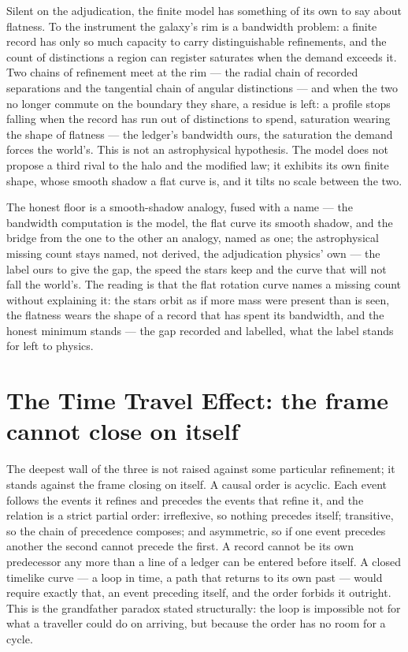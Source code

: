 Silent on the adjudication, the finite model has something of its own to say about flatness. To the instrument
the galaxy's rim is a bandwidth problem: a finite record has only so much capacity to carry distinguishable
refinements, and the count of distinctions a region can register saturates when the demand exceeds it. Two
chains of refinement meet at the rim --- the radial chain of recorded separations and the tangential chain of
angular distinctions --- and when the two no longer commute on the boundary they share, a residue is left: a
profile stops falling when the record has run out of distinctions to spend, saturation wearing the
shape of flatness --- the ledger's bandwidth ours, the saturation the demand forces the world's. This is not an
astrophysical hypothesis. The model does not propose a third rival to the halo and the modified law; it
exhibits its own finite shape, whose smooth shadow a flat curve is, and it tilts no scale between the two.

The honest floor is a smooth-shadow analogy, fused with a name --- the bandwidth computation is the model, the
flat curve its smooth shadow, and the bridge from the one to the other an analogy, named as one; the
astrophysical missing count stays named, not derived, the adjudication physics' own --- the label ours to give
the gap, the speed the stars keep and the curve that will not fall the world's. The reading is that the flat
rotation curve names a missing count without explaining it: the stars orbit as if more mass were present than
is seen, the flatness wears the shape of a record that has spent its bandwidth, and the honest minimum
stands --- the gap recorded and labelled, what the label stands for left to physics.

\section{The Time Travel Effect: the frame cannot close on itself}
\label{se:time-travel}

The deepest wall of the three is not raised against some particular refinement; it stands against the frame
closing on itself. A causal order is acyclic. Each
event follows the events it refines and precedes the events that refine it, and the relation is a strict
partial order: irreflexive, so nothing precedes itself; transitive, so the chain of precedence composes; and
asymmetric, so if one event precedes another the second cannot precede the first. A record cannot be its own
predecessor any more than a line of a ledger can be entered before itself. A closed timelike curve --- a loop
in time, a path that returns to its own past --- would require exactly that, an event preceding itself, and the
order forbids it outright. This is the grandfather paradox stated structurally: the loop is impossible not for
what a traveller could do on arriving, but because the order has no room for a cycle.

